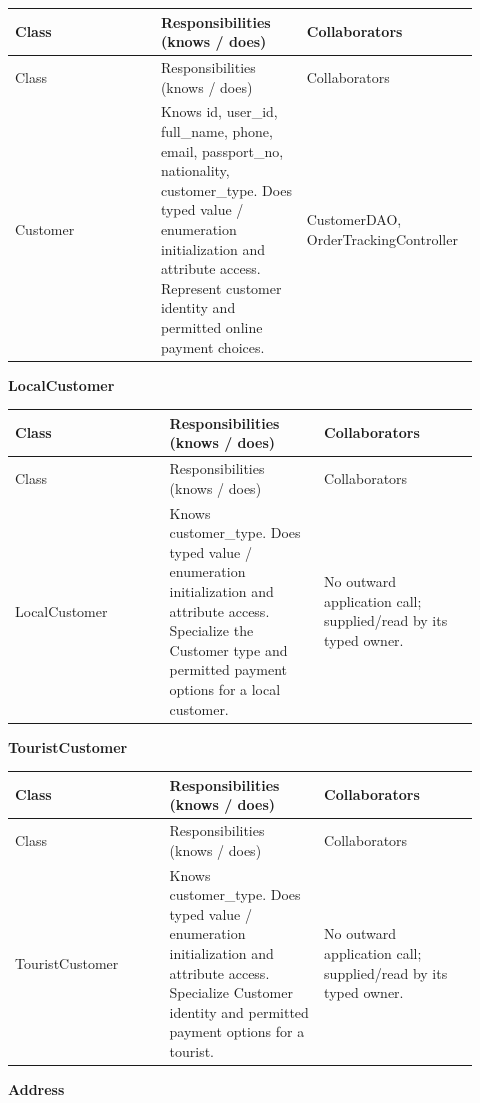 \begin{longtable}{>{\raggedright\arraybackslash}p{0.3067\linewidth}>{\raggedright\arraybackslash}p{0.3067\linewidth}>{\raggedright\arraybackslash}p{0.3067\linewidth}}
Class & Responsibilities (knows / does) & Collaborators \\
\hline\endfirsthead
Class & Responsibilities (knows / does) & Collaborators \\
\hline\endhead
Customer & Knows id, user\_id, full\_name, phone, email, passport\_no, nationality, customer\_type. Does typed value / enumeration initialization and attribute access. Represent customer identity and permitted online payment choices. & CustomerDAO, OrderTrackingController \\
\end{longtable}
\textbf{LocalCustomer}

\begin{longtable}{>{\raggedright\arraybackslash}p{0.3067\linewidth}>{\raggedright\arraybackslash}p{0.3067\linewidth}>{\raggedright\arraybackslash}p{0.3067\linewidth}}
Class & Responsibilities (knows / does) & Collaborators \\
\hline\endfirsthead
Class & Responsibilities (knows / does) & Collaborators \\
\hline\endhead
LocalCustomer & Knows customer\_type. Does typed value / enumeration initialization and attribute access. Specialize the Customer type and permitted payment options for a local customer. & No outward application call; supplied/read by its typed owner. \\
\end{longtable}
\textbf{TouristCustomer}

\begin{longtable}{>{\raggedright\arraybackslash}p{0.3067\linewidth}>{\raggedright\arraybackslash}p{0.3067\linewidth}>{\raggedright\arraybackslash}p{0.3067\linewidth}}
Class & Responsibilities (knows / does) & Collaborators \\
\hline\endfirsthead
Class & Responsibilities (knows / does) & Collaborators \\
\hline\endhead
TouristCustomer & Knows customer\_type. Does typed value / enumeration initialization and attribute access. Specialize Customer identity and permitted payment options for a tourist. & No outward application call; supplied/read by its typed owner. \\
\end{longtable}
\textbf{Address}

